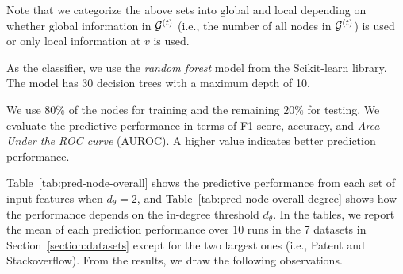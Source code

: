 Note that we categorize the above sets into global and local depending on whether global information in $\mathcal{G}^{(t)}$ (i.e., the number of all nodes in $\mathcal{G}^{(t)}$) is used or only local information at $v$ is used.

As the classifier, we use the \textit{random forest} model from the Scikit-learn library. The model has 30 decision trees with a maximum depth of 10.


We use $80\%$ of the nodes for training and the remaining $20\%$ for testing. 
We evaluate the predictive performance in terms of F1-score, accuracy, and \textit{Area Under the ROC curve} (AUROC). A higher value indicates better prediction performance.


Table~\ref{tab:pred-node-overall} shows the predictive performance from each set of input features when $d_\theta=2$, and Table~\ref{tab:pred-node-overall-degree} shows how the performance depends on the in-degree threshold $d_\theta$.
In the tables, we report the mean of each prediction performance over $10$ runs in the 7 datasets in Section~\ref{section:datasets} except for the two largest ones (i.e., Patent and Stackoverflow).
From the results, we draw the following observations.

\vspace{0.5mm}

\noindent{}

